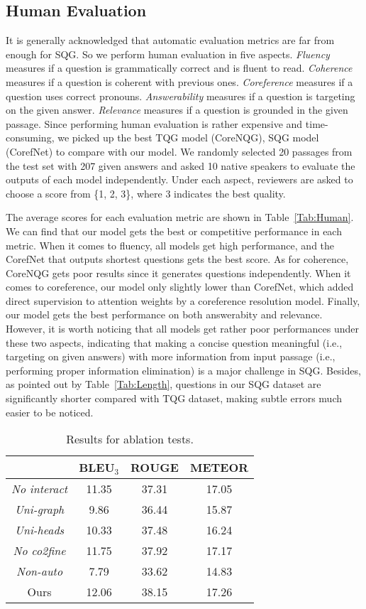 \documentclass[11pt,a4paper]{article}
\begin{document}
\subsection{Human Evaluation}
It is generally acknowledged that automatic evaluation metrics are far from enough for SQG. So we perform human evaluation in five aspects. \textit{Fluency} measures if a question is grammatically correct and is fluent to read. \textit{Coherence} measures if a question is coherent with previous ones. \textit{Coreference} measures if a question uses correct pronouns. \textit{Answerability} measures if a question is targeting on the given answer. \textit{Relevance} measures if a question is grounded in the given passage. 
Since performing human evaluation is rather expensive and time-consuming, we picked up the best TQG model (CoreNQG), SQG model (CorefNet) to compare with our model. 
We randomly selected 20 passages from the test set with 207 given answers and asked 10 native speakers to evaluate the outputs of each model independently. Under each aspect, reviewers are asked to choose a score from \{1, 2, 3\}, where 3 indicates the best quality. 

The average scores for each evaluation metric are shown in Table~\ref{Tab:Human}.
We can find that our model gets the best or competitive performance in each metric. When it comes to fluency, all models get high performance, and the CorefNet that outputs shortest questions gets the best score. As for coherence, CoreNQG gets poor results since it generates questions independently. When it comes to coreference, our model only slightly lower than CorefNet, which added direct supervision to attention weights by a coreference resolution model. 
Finally, our model gets the best performance on both answerabity and relevance. However, it is worth noticing that all models get rather poor performances under these two aspects, indicating that making a concise question meaningful (i.e., targeting on given answers) with more information from input passage (i.e., performing proper information elimination) is a major challenge in SQG. Besides, as pointed out by Table~\ref{Tab:Length}, questions in our SQG dataset are significantly shorter compared with TQG dataset, making subtle errors much easier to be noticed.

\begin{table}[t!]
	\centering
	\begin{tabular}{cccc}
		\hline
		& BLEU$_3$ & ROUGE & METEOR \\ \hline
		\textit{No interact}  & 11.35    & 37.31     & 17.05  \\
		\textit{Uni-graph} & 9.86     & 36.44     & 15.87  \\
		\textit{Uni-heads} & 10.33    & 37.48     & 16.24  \\
		\textit{No co2fine}       & 11.75    & 37.92     & 17.17  \\
		\textit{Non-auto}     & 7.79     & 33.62     & 14.83  \\ \hline
		Ours         & 12.06    & 38.15     & 17.26  \\ \hline
	\end{tabular}
	\caption{Results for ablation tests.}
	\label{Tab:Ablation}
\end{table}
\end{document}
